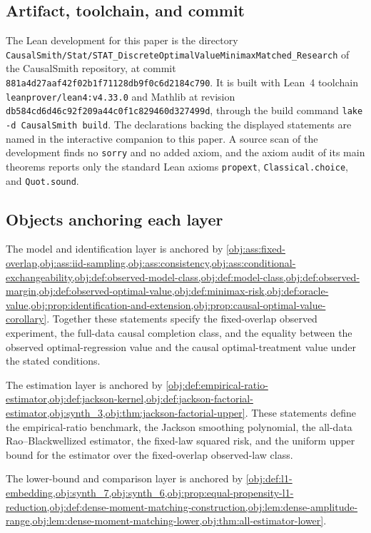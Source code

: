 \documentclass[11pt]{article}
\begin{document}
\subsection*{Artifact, toolchain, and commit}

The Lean development for this paper is the directory \texttt{CausalSmith/Stat/STAT\_DiscreteOptimalValueMinimaxMatched\_Research} of the CausalSmith repository, at commit \texttt{881a4d27aaf42f02b1f71128db9f0c6d2184c790}. It is built with Lean~4 toolchain \texttt{leanprover/lean4:v4.33.0} and Mathlib at revision \texttt{db584cd6d46c92f209a44c0f1c829460d327499d}, through the build command \texttt{lake -d CausalSmith build}. The declarations backing the displayed statements are named in the interactive companion to this paper. A source scan of the development finds no \texttt{sorry} and no added axiom, and the axiom audit of its main theorems reports only the standard Lean axioms \texttt{propext}, \texttt{Classical.choice}, and \texttt{Quot.sound}.

\subsection*{Objects anchoring each layer}

The model and identification layer is anchored by \cref{obj:ass:fixed-overlap,obj:ass:iid-sampling,obj:ass:consistency,obj:ass:conditional-exchangeability,obj:def:observed-model-class,obj:def:model-class,obj:def:observed-margin,obj:def:observed-optimal-value,obj:def:minimax-risk,obj:def:oracle-value,obj:prop:identification-and-extension,obj:prop:causal-optimal-value-corollary}. Together these statements specify the fixed-overlap observed experiment, the full-data causal completion class, and the equality between the observed optimal-regression value and the causal optimal-treatment value under the stated conditions.

The estimation layer is anchored by \cref{obj:def:empirical-ratio-estimator,obj:def:jackson-kernel,obj:def:jackson-factorial-estimator,obj:synth_3,obj:thm:jackson-factorial-upper}. These statements define the empirical-ratio benchmark, the Jackson smoothing polynomial, the all-data Rao--Blackwellized estimator, the fixed-law squared risk, and the uniform upper bound for the estimator over the fixed-overlap observed-law class.

The lower-bound and comparison layer is anchored by \cref{obj:def:l1-embedding,obj:synth_7,obj:synth_6,obj:prop:equal-propensity-l1-reduction,obj:def:dense-moment-matching-construction,obj:lem:dense-amplitude-range,obj:lem:dense-moment-matching-lower,obj:thm:all-estimator-lower}.
\end{document}

